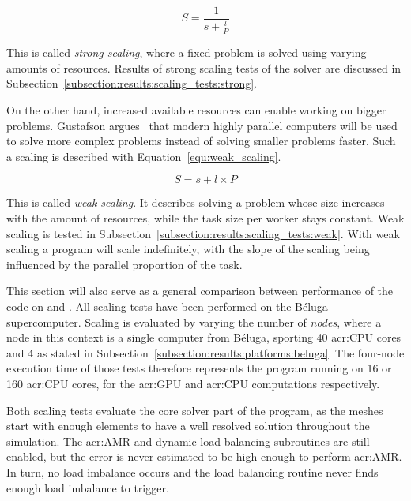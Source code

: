 \begin{equation} \label{equ:strong_scaling}
    S = \frac{1}{s + \frac{l}{P}}
\end{equation}

This is called \textit{strong scaling}, where a fixed problem is solved using varying amounts of
resources. Results of strong scaling tests of the solver are discussed in
Subsection~\ref{subsection:results:scaling_tests:strong}.

On the other hand, increased available resources can enable working on bigger problems. Gustafson
argues~\cite{Gustafson1988} that modern highly parallel computers will be used to solve more complex
problems instead of solving smaller problems faster. Such a scaling is described with
Equation~\ref{equ:weak_scaling}.

\begin{equation} \label{equ:weak_scaling}
    S = s + l \times P
\end{equation}

This is called \textit{weak scaling}. It describes solving a problem whose size increases with the
amount of resources, while the task size per worker stays constant. Weak scaling is tested in
Subsection~\ref{subsection:results:scaling_tests:weak}. With weak scaling a program will scale
indefinitely, with the slope of the scaling being influenced by the parallel proportion of the task.

This section will also serve as a general comparison between performance of the code on
 and . All scaling tests have been performed on the Béluga
supercomputer. Scaling is evaluated by varying the number of \textit{nodes}, where a node in this
context is a single computer from Béluga, sporting 40 \acrshort{acr:CPU} cores and 4
 as stated in Subsection~\ref{subsection:results:platforms:beluga}. The
four-node execution time of those tests therefore represents the program running on 16
 or 160 \acrshort{acr:CPU} cores, for the \acrshort{acr:GPU} and
\acrshort{acr:CPU} computations respectively.

Both scaling tests evaluate the core solver part of the program, as the meshes start with enough
elements to have a well resolved solution throughout the simulation. The \acrlong{acr:AMR} and
dynamic load balancing subroutines are still enabled, but the error is never estimated to be high
enough to perform \acrshort{acr:AMR}. In turn, no load imbalance occurs and the load balancing
routine never finds enough load imbalance to trigger.

